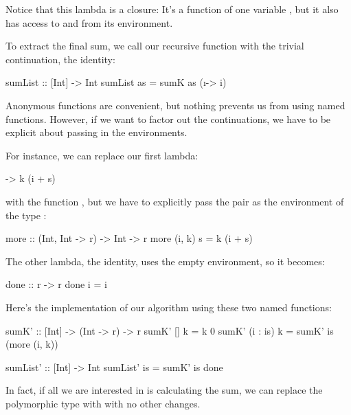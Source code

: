 \documentclass[DaoFP]{subfiles}
\begin{document}
Notice that this lambda is a closure: It's a function of one variable , but it also has access to  and  from its environment.

To extract the final sum, we call our recursive function with the trivial continuation, the identity:
\begin{haskell}
sumList :: [Int] -> Int
sumList as = sumK as (\i -> i)
\end{haskell}

Anonymous functions are convenient, but nothing prevents us from using named functions. However, if we want to factor out the continuations, we have to be explicit about passing in the environments. 

For instance, we can replace our first lambda:
\begin{haskell}
\s -> k (i + s)
\end{haskell}
with the function , but we have to explicitly pass the pair  as the environment of the type :
\begin{haskell}
more :: (Int, Int -> r) -> Int -> r
more (i, k) s = k (i + s)
\end{haskell}
The other lambda, the identity, uses the empty environment, so it becomes:
\begin{haskell}
done :: r -> r
done i = i
\end{haskell}
Here's the implementation of our algorithm using these two named functions:
\begin{haskell}
sumK' :: [Int] -> (Int -> r) -> r
sumK' [] k = k 0
sumK' (i : is) k =
  sumK' is (more (i, k))
\end{haskell}

\begin{haskell}
sumList' :: [Int] -> Int
sumList' is = sumK' is done
\end{haskell}

In fact, if all we are interested in is calculating the sum, we can replace the polymorphic type  with  with no other changes.
\end{document}
